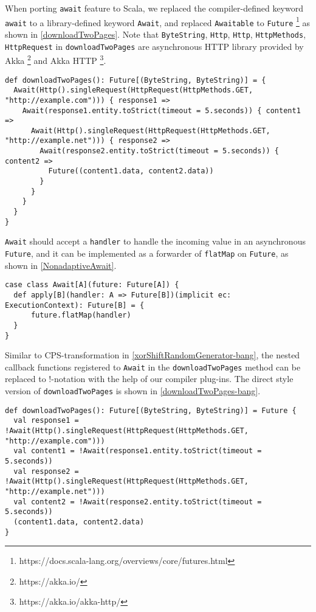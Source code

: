 When porting \lstinline{await} feature to Scala, we replaced the compiler-defined keyword \lstinline{await} to a library-defined keyword \lstinline{Await}, and replaced \lstinline{Awaitable} to \lstinline{Future} \footnote{https://docs.scala-lang.org/overviews/core/futures.html} as shown in \cref{downloadTwoPages}. Note that \lstinline{ByteString}, \lstinline{Http}, \lstinline{Http}, \lstinline{HttpMethods}, \lstinline{HttpRequest} in \lstinline{downloadTwoPages} are asynchronous HTTP library provided by Akka \footnote{https://akka.io/} and Akka HTTP \footnote{https://akka.io/akka-http/}.

\begin{lstlisting}[caption={Asynchronously downloading two web pages in \textit{Dsl.scala} },label={downloadTwoPages}]
def downloadTwoPages(): Future[(ByteString, ByteString)] = {
  Await(Http().singleRequest(HttpRequest(HttpMethods.GET, "http://example.com"))) { response1 =>
    Await(response1.entity.toStrict(timeout = 5.seconds)) { content1 =>
      Await(Http().singleRequest(HttpRequest(HttpMethods.GET, "http://example.net"))) { response2 =>
        Await(response2.entity.toStrict(timeout = 5.seconds)) { content2 =>
          Future((content1.data, content2.data))
        }
      }
    }
  }
}
\end{lstlisting}

\lstinline{Await} should accept a \lstinline{handler} to handle the incoming value in an asynchronous \lstinline{Future}, and it can be implemented as a forwarder of \lstinline{flatMap} on \lstinline{Future}, as shown in \cref{NonadaptiveAwait}.

\begin{lstlisting}[caption={Implementing \lstinline{Await} LDK as a forwarder to \lstinline{flatMap}},label={NonadaptiveAwait}]
case class Await[A](future: Future[A]) {
  def apply[B](handler: A => Future[B])(implicit ec: ExecutionContext): Future[B] = {
      future.flatMap(handler)
  }
}
\end{lstlisting}

Similar to CPS-transformation in \cref{xorShiftRandomGenerator-bang}, the nested callback functions registered to \lstinline{Await} in the \lstinline{downloadTwoPages} method can be replaced to !-notation with the help of our compiler plug-ins. The direct style version of \lstinline{downloadTwoPages} is shown in \cref{downloadTwoPages-bang}.

\begin{lstlisting}[caption={Asynchronously downloading two web pages, in the style of !-notation},label={downloadTwoPages-bang}]
def downloadTwoPages(): Future[(ByteString, ByteString)] = Future {
  val response1 = !Await(Http().singleRequest(HttpRequest(HttpMethods.GET, "http://example.com"))) 
  val content1 = !Await(response1.entity.toStrict(timeout = 5.seconds))
  val response2 = !Await(Http().singleRequest(HttpRequest(HttpMethods.GET, "http://example.net")))
  val content2 = !Await(response2.entity.toStrict(timeout = 5.seconds))
  (content1.data, content2.data)
}
\end{lstlisting}

